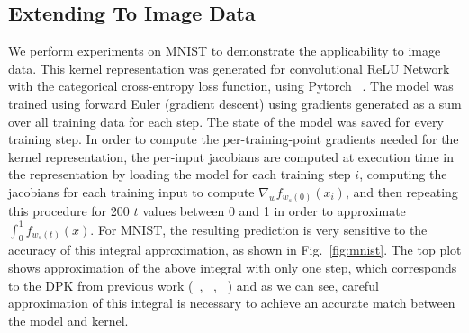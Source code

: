 \subsection{Extending To Image Data}
    We perform experiments on MNIST to demonstrate the applicability to image data. 
    This kernel representation was generated for convolutional ReLU Network with the categorical cross-entropy loss function, using Pytorch ~\cite{pytorch2019}. 
    The model was trained using forward Euler (gradient descent) using gradients generated as a sum over all training data for each step. 
    The state of the model was saved for every training step. In order to compute the per-training-point gradients needed for the kernel representation, the per-input jacobians are computed at execution time in the representation by loading the model for each training step $i$, computing the jacobians for each training input to compute $\nabla_w f_{w_s(0)}(x_i)$, and then repeating this procedure for 200 $t$ values between 0 and 1 in order to approximate $\int_0^1 f_{w_s(t)}(x)$. For MNIST, the resulting prediction is very sensitive to the accuracy of this integral approximation, as shown in Fig.~\ref{fig:mnist}. The top plot shows approximation of the above integral with only one step, which corresponds to the DPK from previous work (~\cite{chen2021equivalence}, ~\cite{domingos2020}, ~\cite{incudini2022quantum}) and as we can see, careful approximation of this integral is necessary to achieve an accurate match between the model and kernel. 

